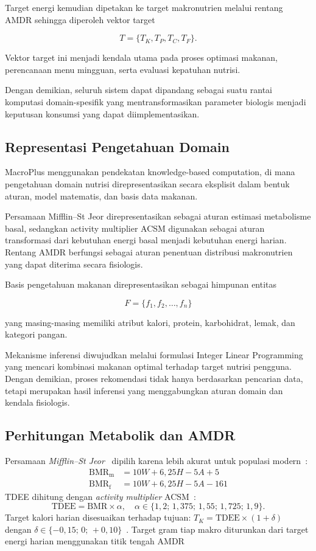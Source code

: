 \documentclass[conference]{IEEEtran}
\begin{document}
Target energi kemudian dipetakan ke target makronutrien melalui
rentang AMDR sehingga diperoleh vektor target

\[
T=\{T_K,T_P,T_C,T_F\}.
\]

Vektor target ini menjadi kendala utama pada proses optimasi makanan,
perencanaan menu mingguan, serta evaluasi kepatuhan nutrisi.

Dengan demikian, seluruh sistem dapat dipandang sebagai suatu rantai
komputasi domain-spesifik yang mentransformasikan parameter biologis
menjadi keputusan konsumsi yang dapat diimplementasikan.

\subsection{Representasi Pengetahuan Domain}

MacroPlus menggunakan pendekatan knowledge-based computation,
di mana pengetahuan domain nutrisi direpresentasikan secara eksplisit
dalam bentuk aturan, model matematis, dan basis data makanan.

Persamaan Mifflin--St Jeor direpresentasikan sebagai aturan estimasi
metabolisme basal, sedangkan activity multiplier ACSM digunakan sebagai
aturan transformasi dari kebutuhan energi basal menjadi kebutuhan energi
harian. Rentang AMDR berfungsi sebagai aturan penentuan distribusi
makronutrien yang dapat diterima secara fisiologis.

Basis pengetahuan makanan direpresentasikan sebagai himpunan entitas

\[
F=\{f_1,f_2,\ldots,f_n\}
\]

yang masing-masing memiliki atribut kalori, protein, karbohidrat,
lemak, dan kategori pangan.

Mekanisme inferensi diwujudkan melalui formulasi Integer Linear
Programming yang mencari kombinasi makanan optimal terhadap target
nutrisi pengguna. Dengan demikian, proses rekomendasi tidak hanya
berdasarkan pencarian data, tetapi merupakan hasil inferensi yang
menggabungkan aturan domain dan kendala fisiologis.

\subsection{Perhitungan Metabolik dan AMDR}
Persamaan \textit{Mifflin--St Jeor}~\cite{mifflin1990new} dipilih karena lebih akurat untuk populasi modern~\cite{frankenfield2005comparison}:
\begin{align}
\text{BMR}_{\text{m}} &= 10W + 6{,}25H - 5A + 5 \\
\text{BMR}_{\text{f}} &= 10W + 6{,}25H - 5A - 161
\end{align}
TDEE dihitung dengan \textit{activity multiplier} ACSM~\cite{acsm2018,thomas2016position}:
\begin{equation}
\text{TDEE} = \text{BMR}\times\alpha,\quad \alpha\in\{1{,}2;\,1{,}375;\,1{,}55;\,1{,}725;\,1{,}9\}.
\end{equation}
Target kalori harian disesuaikan terhadap tujuan: $T_K = \text{TDEE}\times(1+\delta)$ dengan $\delta\in\{-0{,}15;\,0;\,+0{,}10\}$~\cite{thomas2016position,rodriguez2009position}. Target gram tiap makro diturunkan dari
target energi harian menggunakan titik
tengah AMDR~\cite{iom2005}
\end{document}
